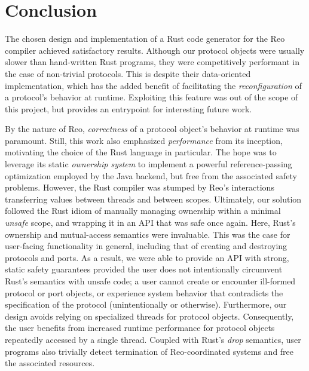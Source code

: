 \section{Conclusion}

The chosen design and implementation of a Rust code generator for the Reo compiler achieved satisfactory results. Although our protocol objects were usually slower than hand-written Rust programs, they were competitively performant in the case of non-trivial protocols. This is despite their data-oriented implementation, which has the added benefit of facilitating the \textit{reconfiguration} of a protocol's behavior at runtime. Exploiting this feature was out of the scope of this project, but provides an entrypoint for interesting future work.

By the nature of Reo, \textit{correctness} of a protocol object's behavior at runtime was paramount. Still, this work also emphasized \textit{performance} from its inception, motivating the choice of the Rust language in particular. The hope was to leverage its static \textit{ownership system} to implement a powerful reference-passing optimization employed by the Java backend, but free from the associated safety problems. However, the Rust compiler was stumped by Reo's interactions transferring values between threads and between scopes. Ultimately, our solution followed the Rust idiom of manually managing ownership within a minimal \textit{unsafe} scope, and wrapping it in an API that was safe once again. Here, Rust's ownership and mutual-access semantics were invaluable. This was the case for user-facing functionality in general, including that of creating and destroying protocols and ports. As a result, we were able to provide an API with strong, static safety guarantees provided the user does not intentionally circumvent Rust's semantics with unsafe code; a user cannot create or encounter ill-formed protocol or port objects, or experience system behavior that contradicts the specification of the protocol (unintentionally or otherwise). Furthermore, our design avoids relying on specialized threads for protocol objects. Consequently, the user benefits from increased runtime performance for protocol objects repeatedly accessed by a single thread. Coupled with Rust's \textit{drop} semantics, user programs also trivially detect termination of Reo-coordinated systems and free the associated resources.

